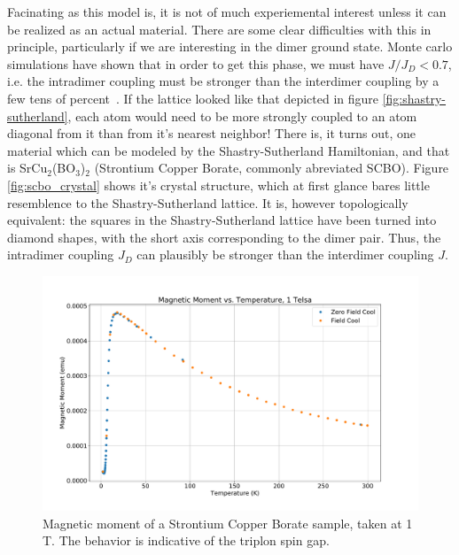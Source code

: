 \documentclass{thesis-umich}
\begin{document}
Facinating as this model is, it is not of much experiemental interest unless it can be realized as an actual material. There are some clear difficulties with this in principle, particularly if we are interesting in the dimer ground state. Monte carlo simulations have shown that in order to get this phase, we must have $J/J_D < 0.7$, i.e. the intradimer coupling must be stronger than the interdimer coupling by a few tens of percent~\cite{Miyahara1999}. If the lattice looked like that depicted in figure \ref{fig:shastry-sutherland}, each atom would need to be more strongly coupled to an atom diagonal from it than from it's nearest neighbor! There is, it turns out, one material which can be modeled by the Shastry-Sutherland Hamiltonian, and that is SrCu$_2$(BO$_3$)$_2$ (Strontium Copper Borate, commonly abreviated SCBO). Figure \ref{fig:scbo_crystal} shows it's crystal structure, which at first glance bares little resemblence to the Shastry-Sutherland lattice. It is, however topologically equivalent: the squares in the Shastry-Sutherland lattice have been turned into diamond shapes, with the short axis corresponding to the dimer pair. Thus, the intradimer coupling $J_D$ can plausibly be stronger than the interdimer coupling $J$. 

\begin{figure}
	\caption[Magnetic moment of a SCBO sample]{Magnetic moment of a Strontium Copper Borate sample, taken at 1 T. The behavior is indicative of the triplon spin gap.}
	\label{fig:scbo_magmom}
	\includegraphics[width=\columnwidth]{figures/SCBO_m_vs_t.pdf}
\end{figure}
\end{document}
